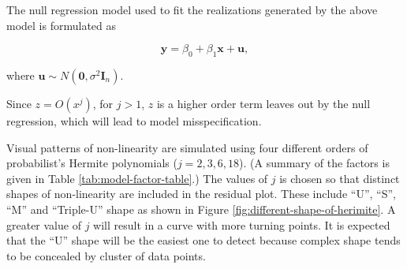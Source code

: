 \documentclass[]{interact}
\theoremstyle{plain}%
\theoremstyle{definition}
\theoremstyle{remark}
\begin{document}
The null regression model used to fit the realizations generated by the
above model is formulated as

\begin{equation} \label{eq:null-model}
\boldsymbol{y} = \beta_0 + \beta_1 \boldsymbol{x} + \boldsymbol{u},
\end{equation}

\noindent where
\(\boldsymbol{u} \sim N(\boldsymbol{0}, \sigma^2\boldsymbol{I}_n)\).

Since \(z = O(x^j)\), for \(j > 1\), \(z\) is a higher order term leaves
out by the null regression, which will lead to model misspecification.

Visual patterns of non-linearity are simulated using four different
orders of probabilist's Hermite polynomials (\(j = 2, 3, 6, 18\)). (A
summary of the factors is given in Table \ref{tab:model-factor-table}.)
The values of \(j\) is chosen so that distinct shapes of non-linearity
are included in the residual plot. These include ``U'', ``S'', ``M'' and
``Triple-U'' shape as shown in Figure
\ref{fig:different-shape-of-herimite}. A greater value of \(j\) will
result in a curve with more turning points. It is expected that the
``U'' shape will be the easiest one to detect because complex shape
tends to be concealed by cluster of data points.

\begin{table}

\caption{\label{tab:model-factor-table}Levels of the factors used in data collection periods I, II, III.}
\centering
{}
\end{table}
\end{document}
